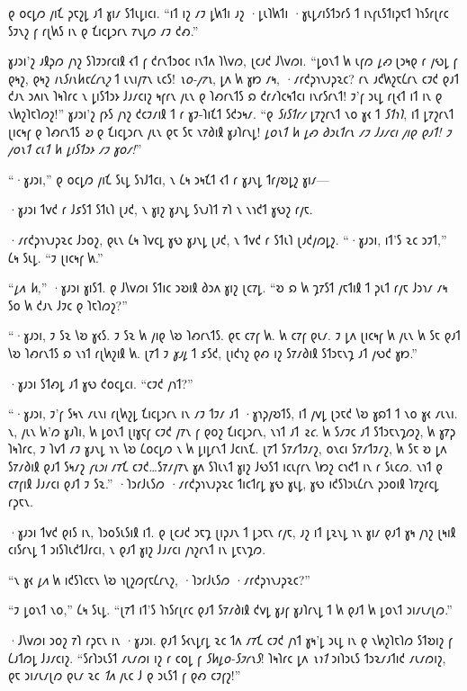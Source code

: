 𐑞 𐑴𐑤𐑛𐑼 𐑢𐑦𐑗 𐑜𐑱𐑟𐑛 𐑨𐑑 𐑣𐑦𐑥 𐑕𐑑𐑧𐑛𐑦𐑤𐑦. “𐑦𐑑 𐑦𐑟 𐑥𐑲 𐑛𐑿𐑑𐑦 𐑨𐑟 ·𐑛𐑧𐑐𐑿𐑑𐑦 ·𐑣𐑧𐑛𐑥𐑦𐑕𐑑𐑮𐑩𐑕 𐑑 𐑦𐑯𐑝𐑧𐑕𐑑𐑦𐑜𐑱𐑑 𐑐𐑪𐑕𐑩𐑚𐑩𐑤 𐑕𐑲𐑯𐑟 𐑝 𐑩𐑚𐑿𐑕 𐑦𐑯 𐑞 𐑗𐑦𐑤𐑛𐑮𐑩𐑯 𐑳𐑯𐑛𐑼 𐑥𐑲 𐑒𐑺.”

𐑣𐑨𐑮𐑦'𐑟 𐑨𐑙𐑜𐑼 𐑢𐑪𐑟 𐑕𐑐𐑲𐑮𐑩𐑤𐑦𐑙 𐑬𐑑 𐑝 𐑒𐑩𐑯𐑑𐑮𐑴𐑤 𐑦𐑯𐑑𐑵 𐑐𐑘𐑫𐑼, 𐑚𐑤𐑨𐑒 𐑓𐑘𐑫𐑼𐑦. “𐑛𐑴𐑯𐑑 𐑿 𐑧𐑝𐑼 \emph{𐑛𐑺} 𐑚𐑮𐑰𐑞 𐑩 𐑢𐑻𐑛 𐑝 𐑞𐑰𐑟, 𐑞𐑰𐑟 \emph{𐑦𐑯𐑕𐑦𐑯𐑿𐑱𐑖𐑩𐑯𐑟} 𐑑 𐑧𐑯𐑦𐑢𐑳𐑯 𐑧𐑤𐑕! \emph{𐑯𐑴-𐑢𐑳𐑯}, 𐑛𐑵 𐑿 𐑣𐑽 𐑥𐑰, ·𐑥𐑩𐑒𐑜𐑪𐑯𐑨𐑜𐑷𐑤? 𐑩𐑯 𐑨𐑒𐑿𐑟𐑱𐑖𐑩𐑯 𐑤𐑲𐑒 𐑞𐑨𐑑 𐑒𐑨𐑯 𐑮𐑵𐑦𐑯 𐑐𐑰𐑐𐑩𐑤 𐑯 𐑛𐑦𐑕𐑑𐑮𐑶 𐑓𐑨𐑥𐑤𐑦𐑟 𐑰𐑝𐑩𐑯 𐑢𐑧𐑯 𐑞 𐑐𐑺𐑩𐑯𐑑𐑕 𐑸 𐑒𐑩𐑥𐑐𐑤𐑰𐑑𐑤𐑦 𐑦𐑯𐑩𐑕𐑩𐑯𐑑! 𐑲'𐑝 𐑮𐑧𐑛 𐑩𐑚𐑬𐑑 𐑦𐑑 𐑦𐑯 𐑞 𐑯𐑿𐑟𐑐𐑱𐑐𐑼𐑟!” 𐑣𐑨𐑮𐑦'𐑟 𐑝𐑶𐑕 𐑢𐑪𐑟 𐑒𐑤𐑲𐑥𐑦𐑙 𐑑 𐑩 𐑣𐑲-𐑐𐑦𐑗𐑑 𐑕𐑒𐑮𐑰𐑥. “𐑞 \emph{𐑕𐑦𐑕𐑑𐑩𐑥} 𐑛𐑳𐑟𐑩𐑯𐑑 𐑯𐑴 𐑣𐑬 𐑑 \emph{𐑕𐑑𐑪𐑐}, 𐑦𐑑 𐑛𐑳𐑟𐑩𐑯𐑑 𐑚𐑦𐑤𐑰𐑝 𐑞 𐑐𐑺𐑩𐑯𐑑𐑕 \emph{𐑹} 𐑞 𐑗𐑦𐑤𐑛𐑮𐑩𐑯 𐑢𐑧𐑯 𐑞𐑱 𐑕𐑱 𐑯𐑳𐑔𐑦𐑙 𐑣𐑨𐑐𐑩𐑯𐑛! \emph{𐑛𐑴𐑯𐑑 𐑿 𐑛𐑺 𐑔𐑮𐑧𐑑𐑩𐑯 𐑥𐑲 𐑓𐑨𐑥𐑤𐑦 𐑢𐑦𐑞 𐑞𐑨𐑑! 𐑲 𐑢𐑴𐑯𐑑 𐑤𐑧𐑑 𐑿 𐑛𐑦𐑕𐑑𐑮𐑶 𐑥𐑲 𐑣𐑴𐑥!}”

“·𐑣𐑨𐑮𐑦,” 𐑞 𐑴𐑤𐑛𐑼 𐑢𐑦𐑗 𐑕𐑧𐑛 𐑕𐑪𐑓𐑑𐑤𐑦, 𐑯 𐑖𐑰 𐑮𐑰𐑗𐑑 𐑬𐑑 𐑩 𐑣𐑨𐑯𐑛 𐑑𐑩𐑢𐑹𐑛𐑟 𐑣𐑦𐑥—

·𐑣𐑨𐑮𐑦 𐑑𐑫𐑒 𐑩 𐑓𐑭𐑕𐑑 𐑕𐑑𐑧𐑐 𐑚𐑨𐑒, 𐑯 𐑣𐑦𐑟 𐑣𐑨𐑯𐑛 𐑕𐑯𐑨𐑐𐑑 𐑳𐑐 𐑯 𐑯𐑪𐑒𐑑 𐑣𐑻𐑟 𐑩𐑢𐑱.

·𐑥𐑩𐑒𐑜𐑪𐑯𐑨𐑜𐑷𐑤 𐑓𐑮𐑴𐑟, 𐑞𐑧𐑯 𐑖𐑰 𐑐𐑫𐑤𐑛 𐑣𐑻 𐑣𐑨𐑯𐑛 𐑚𐑨𐑒, 𐑯 𐑑𐑫𐑒 𐑩 𐑕𐑑𐑧𐑐 𐑚𐑨𐑒𐑢𐑼𐑛𐑟. “·𐑣𐑨𐑮𐑦, 𐑦𐑑'𐑕 𐑷𐑤 𐑮𐑲𐑑,” 𐑖𐑰 𐑕𐑧𐑛. “𐑲 𐑚𐑦𐑤𐑰𐑝 𐑿.”

“\emph{𐑛𐑵 𐑿,}” ·𐑣𐑨𐑮𐑦 𐑣𐑦𐑕𐑑. 𐑞 𐑓𐑘𐑫𐑼𐑦 𐑕𐑑𐑦𐑤 𐑮𐑹𐑦𐑙 𐑔𐑮𐑵 𐑣𐑦𐑟 𐑚𐑤𐑳𐑛. “𐑹 𐑸 𐑿 𐑡𐑳𐑕𐑑 𐑢𐑱𐑑𐑦𐑙 𐑑 𐑜𐑧𐑑 𐑩𐑢𐑱 𐑓𐑮𐑪𐑥 𐑥𐑰 𐑕𐑴 𐑿 𐑒𐑨𐑯 𐑓𐑲𐑤 𐑞 𐑐𐑱𐑐𐑼𐑟?”

“·𐑣𐑨𐑮𐑦, 𐑲 𐑕𐑷 𐑘𐑹 𐑣𐑬𐑕. 𐑲 𐑕𐑷 𐑿 𐑢𐑦𐑞 𐑘𐑹 𐑐𐑺𐑩𐑯𐑑𐑕. 𐑞𐑱 𐑤𐑳𐑝 𐑿. 𐑿 𐑤𐑳𐑝 𐑞𐑧𐑥. 𐑲 𐑛𐑵 𐑚𐑦𐑤𐑰𐑝 𐑿 𐑢𐑧𐑯 𐑿 𐑕𐑱 𐑞𐑨𐑑 𐑘𐑹 𐑐𐑺𐑩𐑯𐑑𐑕 𐑸 𐑯𐑪𐑑 𐑩𐑚𐑿𐑟𐑦𐑙 𐑿. 𐑚𐑳𐑑 𐑲 \emph{𐑣𐑨𐑛} 𐑑 𐑭𐑕𐑒, 𐑚𐑦𐑒𐑪𐑟 𐑞𐑺 𐑦𐑟 𐑕𐑳𐑥𐑔𐑦𐑙 𐑕𐑑𐑮𐑱𐑯𐑡 𐑨𐑑 𐑢𐑻𐑒 𐑣𐑽.”

·𐑣𐑨𐑮𐑦 𐑕𐑑𐑺𐑛 𐑨𐑑 𐑣𐑻 𐑒𐑴𐑤𐑛𐑤𐑦. “𐑤𐑲𐑒 𐑢𐑪𐑑?”

“·𐑣𐑨𐑮𐑦, 𐑲'𐑝 𐑕𐑰𐑯 𐑥𐑧𐑯𐑦 𐑩𐑚𐑿𐑟𐑛 𐑗𐑦𐑤𐑛𐑮𐑩𐑯 𐑦𐑯 𐑥𐑲 𐑑𐑲𐑥 𐑨𐑑 ·𐑣𐑪𐑜𐑢𐑹𐑑𐑕, 𐑦𐑑 𐑢𐑫𐑛 𐑚𐑮𐑱𐑒 𐑘𐑹 𐑣𐑸𐑑 𐑑 𐑯𐑴 𐑣𐑬 𐑥𐑧𐑯𐑦. 𐑯, 𐑢𐑧𐑯 𐑿'𐑼 𐑣𐑨𐑐𐑦, 𐑿 𐑛𐑴𐑯𐑑 𐑚𐑦𐑣𐑱𐑝 𐑤𐑲𐑒 𐑢𐑳𐑯 𐑝 𐑞𐑴𐑟 𐑗𐑦𐑤𐑛𐑮𐑩𐑯, 𐑯𐑪𐑑 𐑨𐑑 \emph{𐑷𐑤}. 𐑿 𐑕𐑥𐑲𐑤 𐑨𐑑 𐑕𐑑𐑮𐑱𐑯𐑡𐑼𐑟, 𐑿 𐑣𐑳𐑜 𐑐𐑰𐑐𐑩𐑤, 𐑲 𐑐𐑫𐑑 𐑥𐑲 𐑣𐑨𐑯𐑛 𐑪𐑯 𐑘𐑹 𐑖𐑴𐑤𐑛𐑼 𐑯 𐑿 𐑛𐑦𐑛𐑩𐑯𐑑 𐑓𐑤𐑦𐑯𐑗. 𐑚𐑳𐑑 𐑕𐑳𐑥𐑑𐑲𐑥𐑟, 𐑴𐑯𐑤𐑦 𐑕𐑳𐑥𐑑𐑲𐑥𐑟, 𐑿 𐑕𐑱 𐑹 𐑛𐑵 𐑕𐑳𐑥𐑔𐑦𐑙 𐑞𐑨𐑑 𐑕𐑰𐑥𐑟 \emph{𐑝𐑧𐑮𐑦} 𐑥𐑳𐑗 𐑤𐑲𐑒…𐑕𐑳𐑥𐑢𐑳𐑯 𐑣𐑵 𐑕𐑐𐑧𐑯𐑑 𐑣𐑦𐑟 𐑓𐑻𐑕𐑑 𐑦𐑤𐑧𐑝𐑩𐑯 𐑘𐑽𐑟 𐑤𐑪𐑒𐑑 𐑦𐑯 𐑩 𐑕𐑧𐑤𐑼. 𐑯𐑪𐑑 𐑞 𐑤𐑳𐑝𐑦𐑙 𐑓𐑨𐑥𐑤𐑦 𐑞𐑨𐑑 𐑲 𐑕𐑷.” ·𐑐𐑮𐑩𐑓𐑧𐑕𐑼 ·𐑥𐑩𐑒𐑜𐑪𐑯𐑨𐑜𐑷𐑤 𐑑𐑦𐑤𐑑𐑩𐑛 𐑣𐑻 𐑣𐑧𐑛, 𐑣𐑻 𐑦𐑒𐑕𐑐𐑮𐑧𐑖𐑩𐑯 𐑜𐑮𐑴𐑦𐑙 𐑐𐑳𐑟𐑩𐑤𐑛 𐑩𐑜𐑱𐑯.

·𐑣𐑨𐑮𐑦 𐑑𐑫𐑒 𐑞𐑦𐑕 𐑦𐑯, 𐑐𐑮𐑴𐑕𐑧𐑕𐑦𐑙 𐑦𐑑. 𐑞 𐑚𐑤𐑨𐑒 𐑮𐑱𐑡 𐑚𐑦𐑜𐑨𐑯 𐑑 𐑛𐑮𐑱𐑯 𐑩𐑢𐑱, 𐑨𐑟 𐑦𐑑 𐑛𐑷𐑯𐑛 𐑪𐑯 𐑣𐑦𐑥 𐑞𐑨𐑑 𐑣𐑰 𐑢𐑪𐑟 𐑚𐑰𐑦𐑙 𐑤𐑦𐑕𐑩𐑯𐑛 𐑑 𐑮𐑦𐑕𐑐𐑧𐑒𐑑𐑓𐑩𐑤𐑦, 𐑯 𐑞𐑨𐑑 𐑣𐑦𐑟 𐑓𐑨𐑥𐑤𐑦 𐑢𐑪𐑟𐑩𐑯𐑑 𐑦𐑯 𐑛𐑱𐑯𐑡𐑼.

“𐑯 𐑣𐑬 \emph{𐑛𐑵} 𐑿 𐑦𐑒𐑕𐑐𐑤𐑱𐑯 𐑘𐑹 𐑪𐑚𐑟𐑼𐑝𐑱𐑖𐑩𐑯𐑟, ·𐑐𐑮𐑩𐑓𐑧𐑕𐑼 ·𐑥𐑩𐑒𐑜𐑪𐑯𐑨𐑜𐑷𐑤?”

“𐑲 𐑛𐑴𐑯𐑑 𐑯𐑴,” 𐑖𐑰 𐑕𐑧𐑛. “𐑚𐑳𐑑 𐑦𐑑'𐑕 𐑐𐑪𐑕𐑩𐑚𐑩𐑤 𐑞𐑨𐑑 𐑕𐑳𐑥𐑔𐑦𐑙 𐑒𐑫𐑛 𐑣𐑨𐑝 𐑣𐑨𐑐𐑩𐑯𐑛 𐑑 𐑿 𐑞𐑨𐑑 𐑿 𐑛𐑴𐑯𐑑 𐑮𐑦𐑥𐑧𐑥𐑚𐑼.”

·𐑓𐑘𐑫𐑼𐑦 𐑮𐑴𐑟 𐑳𐑐 𐑩𐑜𐑱𐑯 𐑦𐑯 ·𐑣𐑨𐑮𐑦. 𐑞𐑨𐑑 𐑕𐑬𐑯𐑛𐑩𐑛 𐑷𐑤 𐑑𐑵 𐑥𐑳𐑗 𐑤𐑲𐑒 𐑢𐑪𐑑 𐑣𐑰'𐑛 𐑮𐑧𐑛 𐑦𐑯 𐑞 𐑯𐑿𐑟𐑐𐑱𐑐𐑼 𐑕𐑑𐑹𐑦𐑟 𐑝 𐑖𐑨𐑑𐑼𐑛 𐑓𐑨𐑥𐑤𐑦𐑟. “𐑕𐑩𐑐𐑮𐑧𐑕𐑑 𐑥𐑧𐑥𐑼𐑦 𐑦𐑟 𐑩 𐑤𐑴𐑛 𐑝 \emph{𐑕𐑿𐑛𐑴-𐑕𐑲𐑩𐑯𐑕}! 𐑐𐑰𐑐𐑩𐑤 𐑛𐑵 \emph{𐑯𐑪𐑑} 𐑮𐑦𐑐𐑮𐑧𐑕 𐑑𐑮𐑷𐑥𐑨𐑑𐑦𐑒 𐑥𐑧𐑥𐑼𐑦𐑟, 𐑞𐑱 𐑮𐑦𐑥𐑧𐑥𐑚𐑼 𐑞𐑧𐑥 𐑷𐑤 \emph{𐑑𐑵} 𐑢𐑧𐑤 𐑓 𐑞 𐑮𐑧𐑕𐑑 𐑝 𐑞𐑺 𐑤𐑲𐑝𐑟!”

